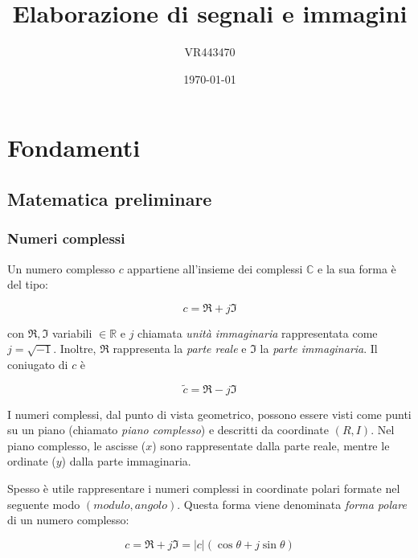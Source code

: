 \documentclass[a4paper]{article}
\begin{document}
	\author{VR443470}
	\title{Elaborazione di segnali e immagini}
	\date{\printdayoff\today}
	\maketitle
	
	\newpage
	\tableofcontents
	
	\newpage
	
	\section{Fondamenti}
	
	\subsection{Matematica preliminare}
	
	\subsubsection{Numeri complessi}
	
	Un numero complesso $c$ appartiene all'insieme dei complessi $\mathbb{C}$ e la sua forma è del tipo:

	\begin{equation*}
		c = \Re + j \Im
	\end{equation*}

	\noindent
	con $\Re, \Im$ variabili $\in\mathbb{R}$ e $j$ chiamata \emph{unità immaginaria} rappresentata come $j = \sqrt{-1}$. Inoltre, $\Re$ rappresenta la \emph{parte reale} e $\Im$ la \emph{parte immaginaria}. Il coniugato di $c$ è
	
	\begin{equation*}
		\tilde{c} = \Re - j \Im
	\end{equation*}

	I numeri complessi, dal punto di vista geometrico, possono essere visti come punti su un piano (chiamato \emph{piano complesso}) e descritti da coordinate $(R, I)$. Nel piano complesso, le ascisse ($x$) sono rappresentate dalla parte reale, mentre le ordinate ($y$) dalla parte immaginaria.
	
	Spesso è utile rappresentare i numeri complessi in coordinate polari formate nel seguente modo $\left(modulo, angolo\right)$. Questa forma viene denominata \emph{forma polare} di un numero complesso:
	
	\begin{equation*}
		c = \Re + j \Im = |c| (\cos{\theta} + j \sin{\theta})
	\end{equation*}
\end{document}
